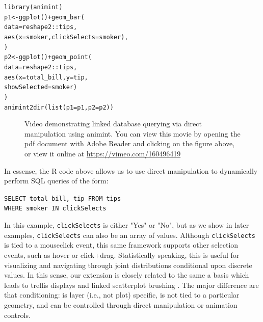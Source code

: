 \documentclass[journal]{vgtc}\usepackage[]{graphicx}\usepackage[]{color}
\makeatletter
\newcommand{\hlopt}[1]{\textcolor[rgb]{0,0,0}{#1}}%
\newcommand{\hlstd}[1]{\textcolor[rgb]{0,0,0}{#1}}%
\newcommand{\hlkwb}[1]{\textcolor[rgb]{0,0,0}{#1}}%
\newcommand{\hlkwc}[1]{\textcolor[rgb]{0,0,1}{#1}}%
\newcommand{\hlkwd}[1]{\textcolor[rgb]{0,0,0}{#1}}%
\newenvironment{kframe}{%
 \def\at@end@of@kframe{}%
 \ifinner\ifhmode%
  \def\at@end@of@kframe{\end{minipage}}%
  \begin{minipage}{\columnwidth}%
 \fi\fi%
 \def\FrameCommand##1{\hskip\@totalleftmargin \hskip-\fboxsep
 \colorbox{shadecolor}{##1}\hskip-\fboxsep
     \hskip-\linewidth \hskip-\@totalleftmargin \hskip\columnwidth}%
 \MakeFramed {\advance\hsize-\width
   \@totalleftmargin\z@ \linewidth\hsize
   \@setminipage}}%
 {\par\unskip\endMakeFramed%
 \at@end@of@kframe}
\newenvironment{knitrout}{}{} %
\makeatother
\begin{document}
\begin{knitrout}
\color{fgcolor}\begin{kframe}
\begin{alltt}
\hlkwd{library}\hlstd{(animint)}
\hlstd{p1} \hlkwb{<-} \hlkwd{ggplot}\hlstd{()} \hlopt{+} \hlkwd{geom_bar}\hlstd{(}
  \hlkwc{data} \hlstd{= reshape2}\hlopt{::}\hlstd{tips,}
  \hlkwd{aes}\hlstd{(}\hlkwc{x} \hlstd{= smoker,} \hlkwc{clickSelects} \hlstd{= smoker),}
\hlstd{)}
\hlstd{p2} \hlkwb{<-} \hlkwd{ggplot}\hlstd{()} \hlopt{+} \hlkwd{geom_point}\hlstd{(}
  \hlkwc{data} \hlstd{= reshape2}\hlopt{::}\hlstd{tips,}
  \hlkwd{aes}\hlstd{(}\hlkwc{x} \hlstd{= total_bill,} \hlkwc{y} \hlstd{= tip,}
      \hlkwc{showSelected} \hlstd{= smoker)}
\hlstd{)}
\hlkwd{animint2dir}\hlstd{(}\hlkwd{list}\hlstd{(}\hlkwc{p1} \hlstd{= p1,} \hlkwc{p2} \hlstd{= p2))}
\end{alltt}
\end{kframe}
\end{knitrout}

\begin{figure}[htp]
	\centerline{}
	\label{fig:tips}
	\caption{Video demonstrating linked database querying via direct manipulation using animint. You can view this movie by opening the pdf document with Adobe Reader and clicking on the figure above, or view it online at \url{https://vimeo.com/160496419}}
\end{figure}

In essense, the R code above allows us to use direct manipulation to dynamically perform SQL queries of the form:

\vspace{0.3cm}
\texttt{SELECT total\_bill, tip FROM tips} \\
\hspace*{1cm} \texttt{WHERE smoker IN clickSelects}
\vspace{0.3cm}

In this example, \texttt{clickSelects} is either "Yes" or "No", but as we show in later examples, \texttt{clickSelects} can also be an array of values. Although \texttt{clickSelects} is tied to a mouseclick event, this same framework supports other selection events, such as hover or click+drag. Statistically speaking, this is useful for visualizing and navigating through joint distributions conditional upon discrete values. In this sense, our extension is closely related to the same a basis which leads to trellis displays \citep{trellis} and linked scatterplot brushing \citep{brushing-scatterplots}. The major difference are that conditioning: is layer (i.e., not plot) specific, is not tied to a particular geometry, and can be controlled through direct manipulation or animation controls.
\end{document}
